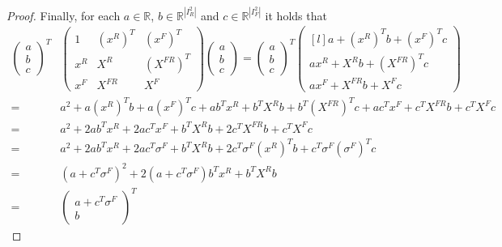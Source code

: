 \documentclass[10pt,a4paper]{amsart}
\begin{document}
\begin{proof}
\newcommand{\myVecE}{a} %
\newcommand{\myVecR}{b} %
\newcommand{\myVecF}{c} %
Finally, for each $\myVecE \in \mathbb{R}$, $\myVecR \in \mathbb R^{|I^2_R|}$ and $\myVecF \in \mathbb R^{|I^2_F|}$ it holds that 
\begingroup
\allowdisplaybreaks
\begin{align*}
    \begin{pmatrix} \myVecE \\ \myVecR \\ \myVecF \end{pmatrix}^T
    &\begin{pmatrix}
        1   & (x^R)^T & (x^F)^T \\
        x^R & X^R   & (X^{FR})^T \\
        x^F & X^{FR} & X^F  \end{pmatrix}
    \begin{pmatrix}\myVecE \\ \myVecR \\ \myVecF \end{pmatrix} 
    = \begin{pmatrix} \myVecE \\ \myVecR \\ \myVecF \end{pmatrix}^T 
    \begin{pmatrix*}[l]
        \myVecE + (x^R)^T \myVecR + (x^F)^T \myVecF \\ 
        \myVecE x^R + X^R \myVecR + (X^{FR})^T \myVecF\\ 
        \myVecE x^F + X^{FR} \myVecR + X^F \myVecF \end{pmatrix*}\\
    = & \myVecE^2 + \myVecE (x^R)^T \myVecR + \myVecE (x^F)^T \myVecF 
     + \myVecE \myVecR^T x^R + \myVecR^T X^R \myVecR + \myVecR^T (X^{FR})^T \myVecF 
     + \myVecE \myVecF^T x^F + \myVecF^T X^{FR} \myVecR + \myVecF^T X^F \myVecF\\
    = & \myVecE^2 + 2 \myVecE \myVecR^T x^R + 2 \myVecE \myVecF^T x^F 
      + \myVecR^T X^R \myVecR + 2 \myVecF^T X^{FR} \myVecR 
      + \myVecF^T X^F \myVecF\\ 
    = & \myVecE^2 + 2 \myVecE \myVecR^T x^R + 2 \myVecE \myVecF^T \sigma^F 
      + \myVecR^T X^R \myVecR + 2 \myVecF^T \sigma^F(x^R)^T \myVecR 
      + \myVecF^T \sigma^F(\sigma^F)^T \myVecF\\ 
    = & (\myVecE + \myVecF^T \sigma^F)^2 + 2 (\myVecE + \myVecF^T \sigma^F) \myVecR^T x^R 
      + \myVecR^T X^R \myVecR \\ 
    = & \begin{pmatrix} \myVecE + \myVecF^T \sigma^F \\ \myVecR \end{pmatrix}^T

\end{align*}
\end{proof}
\end{document}
